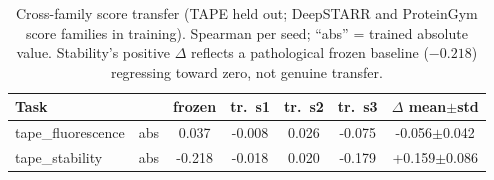 \begin{table}[t]
\centering
\caption{Cross-family score transfer (TAPE held out; DeepSTARR and ProteinGym score families in training). Spearman per seed; ``abs'' = trained absolute value. Stability's positive $\Delta$ reflects a pathological frozen baseline ($-0.218$) regressing toward zero, not genuine transfer.}
\label{tab:tape}
\small
\begin{tabular}{llccccc}
\toprule
Task & & frozen & tr.\ s1 & tr.\ s2 & tr.\ s3 & $\Delta$ mean$\pm$std \\ \midrule
tape\_fluorescence & abs & 0.037 & -0.008 & 0.026 & -0.075 & -0.056$\pm$0.042 \\
tape\_stability & abs & -0.218 & -0.018 & 0.020 & -0.179 & +0.159$\pm$0.086 \\
\bottomrule
\end{tabular}
\end{table}
